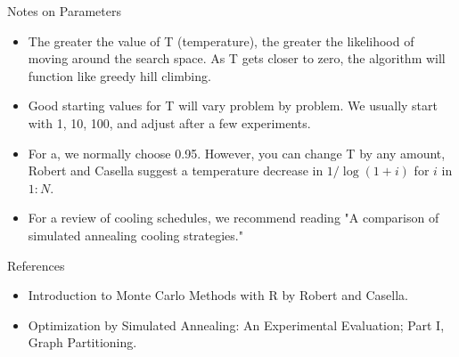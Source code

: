 \documentclass{beamer}
\begin{document}
\begin{frame}{Notes on Parameters}
\begin{itemize}
\item The greater the value of T (temperature), the greater the likelihood of moving around the search space. As T gets closer to zero, the algorithm will function like greedy hill climbing.
\item Good starting values for T will vary problem by problem. We usually start with 1, 10, 100, and adjust after a few experiments.
\item For a, we normally choose 0.95. However, you can change T by any amount, Robert and Casella suggest a temperature decrease in $1/\log(1+i)$ for $i$ in $1:N$.
\item For a review of cooling schedules, we recommend reading "A comparison of simulated annealing cooling strategies."
\end{itemize}
\end{frame}

\begin{frame}{References}
\begin{itemize}
\item Introduction to Monte Carlo Methods with R by Robert and Casella.
\item Optimization by Simulated Annealing: An Experimental Evaluation; Part I, Graph Partitioning.
\end{itemize}
\end{frame}
\end{document}
